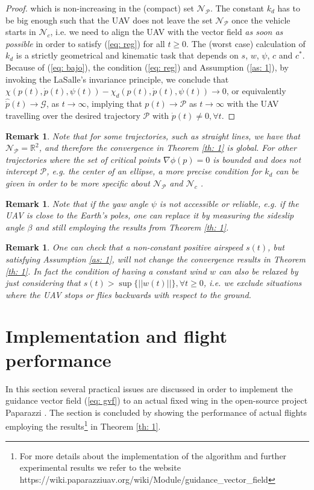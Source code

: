 \documentclass[letterpaper, 10 pt, conference]{ieeeconf}  %
\newtheorem{remark}[theorem]{Remark}
\begin{document}
\begin{proof}
	which is non-increasing in the (compact) set $\mathcal{N}_{\mathcal{P}}$. The constant $k_d$ has to be big enough such that the UAV does not leave the set $\mathcal{N}_{\mathcal{P}}$ once the vehicle starts in $\mathcal{N}_c$, i.e. we need to align the UAV with the vector field \emph{as soon as possible} in order to satisfy (\ref{eq: reg}) for all $t\geq 0$. The (worst case) calculation of $k_d$ is a strictly geometrical and kinematic task that depends on $s$, $w$, $\psi$, $c$ and $c^*$. Because of (\ref{eq: bajo}), the condition (\ref{eq: reg}) and Assumption (\ref{as: 1}), by invoking the LaSalle's invariance principle, we conclude that $\chi\left(p(t), \dot p(t), \psi(t)\right) - \chi_d\left(p(t), \dot p(t), \psi(t)\right) \to 0$, or equivalently $ \hat{\dot p}(t) \to \mathcal{G}$, as $t \to \infty$, implying that $p(t) \to \mathcal{P}$ as $t \to \infty$ with the UAV travelling over the desired trajectory $\mathcal{P}$ with $\dot p(t)\neq 0, \forall t$.
\end{proof}
\begin{remark}
	Note that for some trajectories, such as straight lines, we have that $\mathcal{N}_{\mathcal{P}} = \mathbb{R}^2$, and therefore the convergence in Theorem \ref{th: 1} is global. For other trajectories where the set of critical points $\nabla\phi(p) = 0$ is bounded and does not intercept $\mathcal{P}$, e.g. the center of an ellipse, a more precise condition for $k_d$ can be given in order to be more specific about $\mathcal{N}_{\mathcal{P}}$ and $\mathcal{N}_c$ \cite{YuriCS}.
\end{remark}
\begin{remark}
Note that if the yaw angle $\psi$ is not accessible or reliable, e.g. if the UAV is close to the Earth's poles, one can replace it by measuring the sideslip angle $\beta$ and still employing the results from Theorem \ref{th: 1}.
\end{remark}
\begin{remark}
	One can check that a non-constant positive airspeed $s(t)$, but satisfying Assumption \ref{as: 1}, will not change the convergence results in Theorem \ref{th: 1}. In fact the condition of having a constant wind $w$ can also be relaxed by just considering that $s(t) > \operatorname{sup}\{||w(t)||\}, \forall t \geq 0$, i.e. we exclude situations where the UAV stops or flies \emph{backwards} with respect to the ground.
\end{remark}

\section{Implementation and flight performance}
\label{sec: fl}
In this section several practical issues are discussed in order to implement the guidance vector field (\ref{eq: gvf}) to an actual fixed wing in the open-source project Paparazzi \cite{papa}. The section is concluded by showing the performance of actual flights employing the results\footnote{For more details about the implementation of the algorithm and further experimental results we refer to the website https://wiki.paparazziuav.org/wiki/Module/guidance\_vector\_field} in Theorem \ref{th: 1}.
\end{document}
